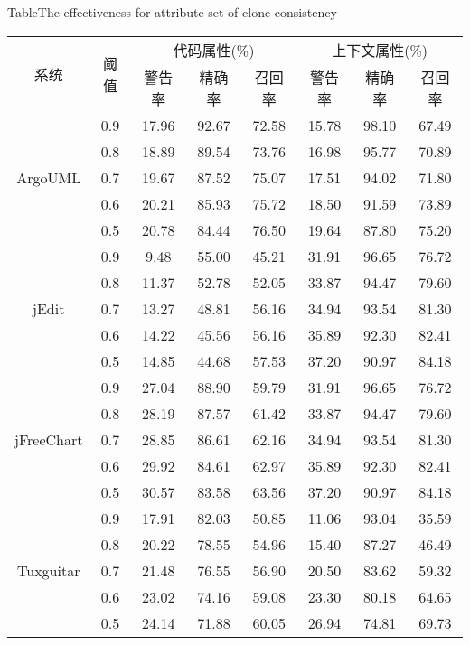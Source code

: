 \begin{table}[htbp]
{Table$\!$}{The effectiveness for attribute set of clone consistency}
\vspace{0.5em}\centering\wuhao
\begin{tabular}{cccccccc}
\toprule[1.5pt]
\multirow{2}{*}{系统}&\multirow{2}{*}{阈值}&\multicolumn{3}{c}{ 代码属性(\%)}&\multicolumn{3}{c}{上下文属性(\%)}\\
\cline{3-8}
&&{警告率}&{精确率}&{召回率}&{警告率}&{精确率}&{召回率}\\
\midrule[1pt]
\multirow{5}{*}{ArgoUML}
&0.9&	17.96&	92.67&	72.58&	15.78&	98.10&	67.49\\
&0.8&	18.89&	89.54&	73.76&	16.98&	95.77&	70.89\\
&0.7&	19.67&	87.52&	75.07&	17.51&	94.02&	71.80\\
&0.6&	20.21&	85.93&	75.72&	18.50&	91.59&	73.89\\
&0.5&	20.78&	84.44&	76.50&	19.64&	87.80&	75.20\\
\hline
\multirow{5}{*}{jEdit}
&0.9&	9.48&	55.00&	45.21&	31.91&	96.65&	76.72\\
&0.8&	11.37&	52.78&	52.05&	33.87&	94.47&	79.60\\
&0.7&	13.27&	48.81&	56.16&	34.94&	93.54&	81.30\\
&0.6&	14.22&	45.56&	56.16&	35.89&	92.30&	82.41\\
&0.5&	14.85&	44.68&	57.53&	37.20&	90.97&	84.18\\
\hline
\multirow{5}{*}{jFreeChart}
&0.9&	27.04&	88.90&	59.79&	31.91&	96.65&	76.72\\
&0.8&	28.19&	87.57&	61.42&	33.87&	94.47&	79.60\\
&0.7&	28.85&	86.61&	62.16&	34.94&	93.54&	81.30\\
&0.6&	29.92&	84.61&	62.97&	35.89&	92.30&	82.41\\
&0.5&	30.57&	83.58&	63.56&	37.20&	90.97&	84.18\\
\hline
\multirow{5}{*}{Tuxguitar}
&0.9&	17.91&	82.03&	50.85&	11.06&	93.04&	35.59\\
&0.8&	20.22&	78.55&	54.96&	15.40&	87.27&	46.49\\
&0.7&	21.48&	76.55&	56.90&	20.50&	83.62&	59.32\\
&0.6&	23.02&	74.16&	59.08&	23.30&	80.18&	64.65\\
&0.5&	24.14&	71.88&	60.05&	26.94&	74.81&	69.73\\
\bottomrule[1.5pt]
\end{tabular}
\end{table}

